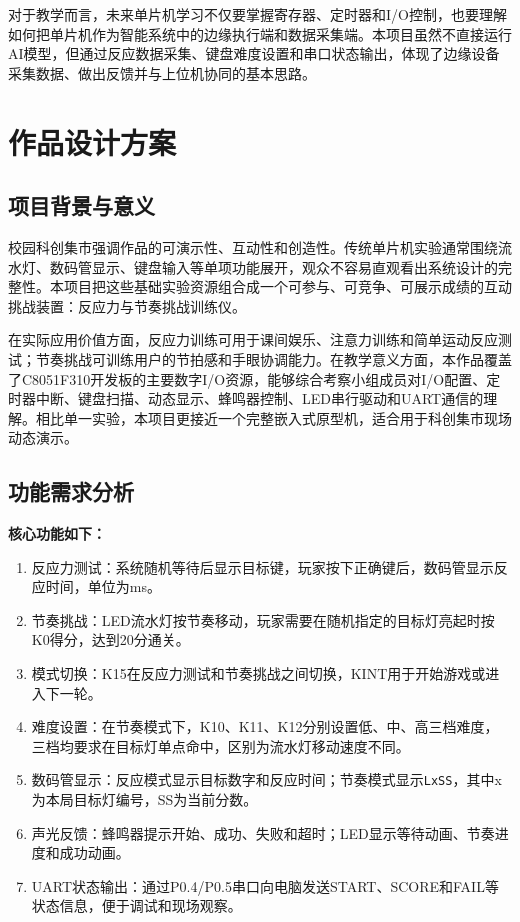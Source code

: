 ﻿\documentclass[UTF8,a4paper,12pt]{ctexart}
\begin{document}
对于教学而言，未来单片机学习不仅要掌握寄存器、定时器和I/O控制，也要理解如何把单片机作为智能系统中的边缘执行端和数据采集端。本项目虽然不直接运行AI模型，但通过反应数据采集、键盘难度设置和串口状态输出，体现了边缘设备采集数据、做出反馈并与上位机协同的基本思路。

\section{作品设计方案}

\subsection{项目背景与意义}
校园科创集市强调作品的可演示性、互动性和创造性。传统单片机实验通常围绕流水灯、数码管显示、键盘输入等单项功能展开，观众不容易直观看出系统设计的完整性。本项目把这些基础实验资源组合成一个可参与、可竞争、可展示成绩的互动挑战装置：反应力与节奏挑战训练仪。

在实际应用价值方面，反应力训练可用于课间娱乐、注意力训练和简单运动反应测试；节奏挑战可训练用户的节拍感和手眼协调能力。在教学意义方面，本作品覆盖了C8051F310开发板的主要数字I/O资源，能够综合考察小组成员对I/O配置、定时器中断、键盘扫描、动态显示、蜂鸣器控制、LED串行驱动和UART通信的理解。相比单一实验，本项目更接近一个完整嵌入式原型机，适合用于科创集市现场动态演示。

\subsection{功能需求分析}
\textbf{核心功能如下：}
\begin{enumerate}
  \item 反应力测试：系统随机等待后显示目标键，玩家按下正确键后，数码管显示反应时间，单位为ms。
  \item 节奏挑战：LED流水灯按节奏移动，玩家需要在随机指定的目标灯亮起时按K0得分，达到20分通关。
  \item 模式切换：K15在反应力测试和节奏挑战之间切换，KINT用于开始游戏或进入下一轮。
  \item 难度设置：在节奏模式下，K10、K11、K12分别设置低、中、高三档难度，三档均要求在目标灯单点命中，区别为流水灯移动速度不同。
  \item 数码管显示：反应模式显示目标数字和反应时间；节奏模式显示\texttt{LxSS}，其中x为本局目标灯编号，SS为当前分数。
  \item 声光反馈：蜂鸣器提示开始、成功、失败和超时；LED显示等待动画、节奏进度和成功动画。
  \item UART状态输出：通过P0.4/P0.5串口向电脑发送START、SCORE和FAIL等状态信息，便于调试和现场观察。
\end{enumerate}
\end{document}
